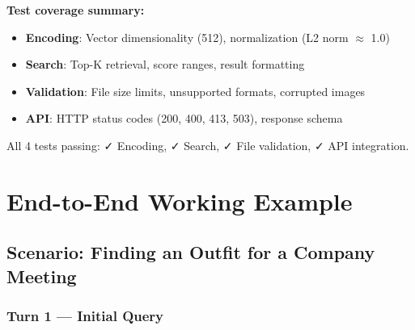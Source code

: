 \documentclass[12pt, twoside]{report}
\begin{document}
\textbf{Test coverage summary:}
\begin{itemize}
    \item \textbf{Encoding}: Vector dimensionality (512), normalization (L2 norm $\approx$ 1.0)
    \item \textbf{Search}: Top-K retrieval, score ranges, result formatting
    \item \textbf{Validation}: File size limits, unsupported formats, corrupted images
    \item \textbf{API}: HTTP status codes (200, 400, 413, 503), response schema
\end{itemize}

All 4 tests passing: ✓ Encoding, ✓ Search, ✓ File validation, ✓ API integration.

\chapter{End-to-End Working Example}

\section{Scenario: Finding an Outfit for a Company Meeting}

\subsection{Turn 1 --- Initial Query}
\end{document}
